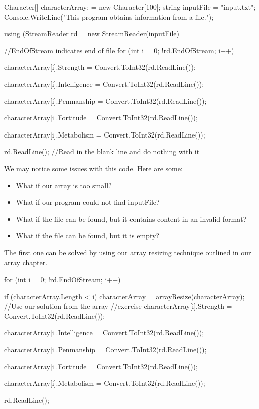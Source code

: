 \documentclass[oneside, openany] {book}
\begin{document}
\begin{CSharp}
Character[] characterArray; = new Character[100];
string inputFile = "input.txt";
Console.WriteLine("This program obtains information from a file.");

using (StreamReader rd = new StreamReader(inputFile)
{
//EndOfStream indicates end of file
for (int i = 0; !rd.EndOfStream; i++)
    {
      characterArray[i].Strength = Convert.ToInt32(rd.ReadLine());
      
      characterArray[i].Intelligence = Convert.ToInt32(rd.ReadLine());
      
      characterArray[i].Penmanship = Convert.ToInt32(rd.ReadLine());
      
      characterArray[i].Fortitude = Convert.ToInt32(rd.ReadLine());
      
      characterArray[i].Metabolism = Convert.ToInt32(rd.ReadLine());
      
      rd.ReadLine(); //Read in the blank line and do nothing with it
    }
}
\end{CSharp}
We may notice some issues with this code. Here are some:
\begin{itemize}
    \item What if our array is too small?
    \item What if our program could not find inputFile?
    \item What if the file can be found, but it contains content in an invalid format?
    \item What if the file can be found, but it is empty?
\end{itemize}
The first one can be solved by using our array resizing technique outlined in our array chapter.

\begin{CSharp}
 for (int i = 0; !rd.EndOfStream; i++)
    {
    if (characterArray.Length < i)
{
        characterArray = arrayResize(characterArray); //Use our solution from the array 
        //exercise
}
       characterArray[i].Strength = Convert.ToInt32(rd.ReadLine());
       
      characterArray[i].Intelligence = Convert.ToInt32(rd.ReadLine());
      
      characterArray[i].Penmanship = Convert.ToInt32(rd.ReadLine());
      
      characterArray[i].Fortitude = Convert.ToInt32(rd.ReadLine());
      
      characterArray[i].Metabolism = Convert.ToInt32(rd.ReadLine());
      
      rd.ReadLine();
}

\end{CSharp}
\end{document}
